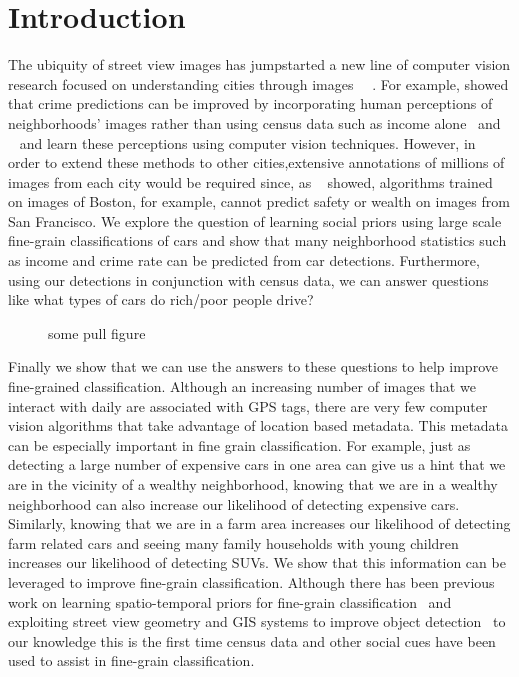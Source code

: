 \documentclass[10pt,twocolumn,letterpaper]{article}
\begin{document}
\section{Introduction}
The ubiquity of street view images has jumpstarted a new line of computer vision research focused on understanding cities through images \cite{mit_plos_1}~\cite{MIT_vision}~\cite{tamara}. For example, \cite{mit_plos_1} showed that crime predictions can be improved by incorporating human perceptions of neighborhoods' images rather than using census data such as income alone~\cite{mit_plos_1} and ~\cite{tamara} and \cite{MIT_vision} learn these perceptions using computer vision techniques. However, in order to extend these methods to other cities,extensive annotations of millions of images from each city would be required since, as ~\cite{tamara} showed, algorithms trained on images of Boston, for example, cannot predict safety or wealth on images from San Francisco.  We explore the question of learning social priors using large scale fine-grain classifications of cars and show that many neighborhood statistics such as income and crime rate can be predicted from car detections. Furthermore, using our detections in conjunction with census data, we can answer questions like what types of cars do rich/poor people drive? 

\begin{figure}[t]
\begin{center}
\fbox{\rule{0pt}{2in} \rule{0.9\linewidth}{0pt}}
\end{center}
   \caption{some pull figure}
\label{fig:pull}
\end{figure}

Finally we show that we can use the answers to these questions to help improve fine-grained classification. Although an increasing number of images that we interact with daily are associated with GPS tags, there are very few computer vision algorithms that take advantage of location based metadata. This metadata can be especially important in fine grain classification. For example, just as detecting a large number of expensive cars in one area can give us a hint that we are in the vicinity of a wealthy neighborhood, knowing that we are in a wealthy neighborhood can also increase our likelihood of detecting expensive cars. Similarly, knowing that we are in a farm area increases our likelihood of detecting farm related cars and seeing many family households with young children increases our likelihood of detecting SUVs. We show that this information can be leveraged to improve fine-grain classification. Although there has been previous work on learning spatio-temporal priors for fine-grain classification~\cite{birdsnap} and exploiting street view geometry and GIS systems to improve object detection~\cite{nyc3D,amir} to our knowledge this is the first time census data and other social cues have been used to assist in fine-grain classification.  
\end{document}
